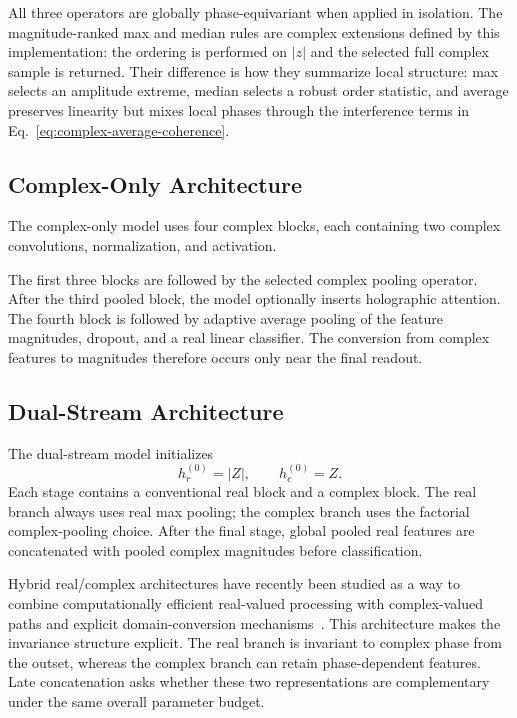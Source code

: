All three operators are globally phase-equivariant when applied in isolation. The magnitude-ranked max and median rules are complex extensions defined by this implementation: the ordering is performed on $|z|$ and the selected full complex sample is returned. Their difference is how they summarize local structure: max selects an amplitude extreme, median selects a robust order statistic, and average preserves linearity but mixes local phases through the interference terms in Eq.~\eqref{eq:complex-average-coherence}.

\subsection{Complex-Only Architecture}
The complex-only model uses four complex blocks, each containing two complex convolutions, normalization, and activation.

The first three blocks are followed by the selected complex pooling operator. After the third pooled block, the model optionally inserts holographic attention. The fourth block is followed by adaptive average pooling of the feature magnitudes, dropout, and a real linear classifier. The conversion from complex features to magnitudes therefore occurs only near the final readout.

\subsection{Dual-Stream Architecture}
The dual-stream model initializes
\begin{equation}
h_r^{(0)}=|Z|,\qquad h_c^{(0)}=Z.
\end{equation}
Each stage contains a conventional real block and a complex block. The real branch always uses real max pooling; the complex branch uses the factorial complex-pooling choice. After the final stage, global pooled real features are concatenated with pooled complex magnitudes before classification.

Hybrid real/complex architectures have recently been studied as a way to combine computationally efficient real-valued processing with complex-valued paths and explicit domain-conversion mechanisms~\cite{Young2026Hybrid}. This architecture makes the invariance structure explicit. The real branch is invariant to complex phase from the outset, whereas the complex branch can retain phase-dependent features. Late concatenation asks whether these two representations are complementary under the same overall parameter budget.

